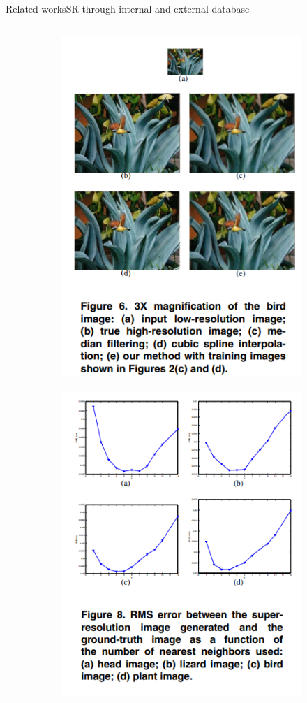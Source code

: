 \documentclass{beamer}
\begin{document}
\begin{frame}{Related works}{SR through internal and external database\cite[Releated works]{LapSRN}}
\begin{columns}
\begin{column}{0.5\textwidth}
            \begin{figure}
                \centering
                \begin{subfigure}[l]{0.55\textwidth}
                    \vspace*{-50px}
                    \includegraphics[height=0.30\textheight, keepaspectratio]{result-neighbour-embedding.png}
                \end{subfigure}
                \begin{subfigure}[l]{0.55\textwidth}
                    \includegraphics[height=0.30\textheight, keepaspectratio]{rms-neighbour-embedding.png}                    

\end{subfigure}
\end{figure}
\end{column}
\end{columns}
\end{frame}
\end{document}
